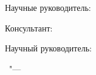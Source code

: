 %
\vspace{0pt plus4fill} %
\begin{flushright}
\ifdefined\supervisorTwoFio
Научные руководитель:


\ifdefined\supervisorDead
\framebox{\supervisorFio}
\else
\supervisorFio
\fi

Консультант:


\ifdefined\supervisorTwoDead
\framebox{\supervisorTwoFio}
\else
\supervisorTwoFio
\fi
\else
Научный руководитель:

\ifdefined\supervisorDead
\framebox{\supervisorFio}
\else
\supervisorFio
\fi
\fi


\end{flushright}
%
\vspace{0pt plus4fill} %
{\centering\thesisCity\ "--- \thesisYear\par}
